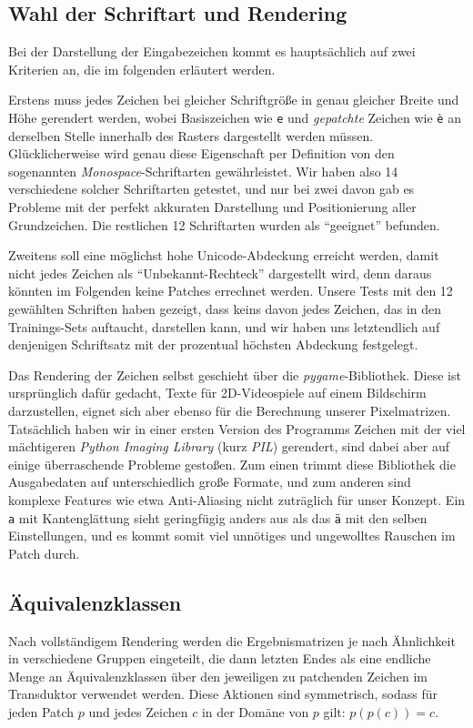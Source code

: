 \documentclass[11pt,a4paper]{article}
\begin{document}
\subsection{Wahl der Schriftart und Rendering}
Bei der Darstellung der Eingabezeichen kommt es hauptsächlich auf zwei Kriterien an, die im folgenden erläutert werden.

Erstens muss jedes Zeichen bei gleicher Schriftgröße in genau gleicher Breite und Höhe gerendert werden, wobei Basiszeichen wie \texttt{e} und \textit{gepatchte} Zeichen wie \texttt{è} an derselben Stelle innerhalb des Rasters dargestellt werden müssen.
Glücklicherweise wird genau diese Eigenschaft per Definition von den sogenannten \textit{Monospace}-Schriftarten gewährleistet. Wir haben also 14 verschiedene solcher Schriftarten getestet, und nur bei zwei davon gab es Probleme mit der perfekt akkuraten Darstellung und Positionierung aller Grundzeichen. Die restlichen 12 Schriftarten wurden als \enquote{geeignet} befunden.

Zweitens soll eine möglichst hohe Unicode-Abdeckung erreicht werden, damit nicht jedes Zeichen als \enquote{Unbekannt-Rechteck} dargestellt wird, denn daraus könnten im Folgenden keine Patches errechnet werden. Unsere Tests mit den 12 gewählten Schriften haben gezeigt, dass keins davon jedes Zeichen, das in den Trainings-Sets auftaucht, darstellen kann, und wir haben uns letztendlich auf denjenigen Schriftsatz mit der prozentual höchsten Abdeckung festgelegt.

Das Rendering der Zeichen selbst geschieht über die \textit{pygame}-Bibliothek. Diese ist ursprünglich dafür gedacht, Texte für 2D-Videospiele auf einem Bildschirm darzustellen, eignet sich aber ebenso für die Berechnung unserer Pixelmatrizen. Tatsächlich haben wir in einer ersten Version des Programms Zeichen mit der viel mächtigeren \textit{Python Imaging Library} (kurz \textit{PIL}) gerendert, sind dabei aber auf einige überraschende Probleme gestoßen. Zum einen trimmt diese Bibliothek die Ausgabedaten auf unterschiedlich große Formate, und zum anderen sind komplexe Features wie etwa Anti-Aliasing nicht zuträglich für unser Konzept. Ein \texttt{a} mit Kantenglättung sieht geringfügig anders aus als das \texttt{ä} mit den selben Einstellungen, und es kommt somit viel unnötiges und ungewolltes Rauschen im Patch durch.

\subsection{Äquivalenzklassen}
Nach vollständigem Rendering werden die Ergebnismatrizen je nach Ähnlichkeit in verschiedene Gruppen eingeteilt, die dann letzten Endes als eine endliche Menge an Äquivalenzklassen über den jeweiligen zu patchenden Zeichen im Transduktor verwendet werden. Diese Aktionen sind symmetrisch, sodass für jeden Patch $p$ und jedes Zeichen $c$ in der Domäne von $p$ gilt: $p(p(c)) = c$.
\end{document}

